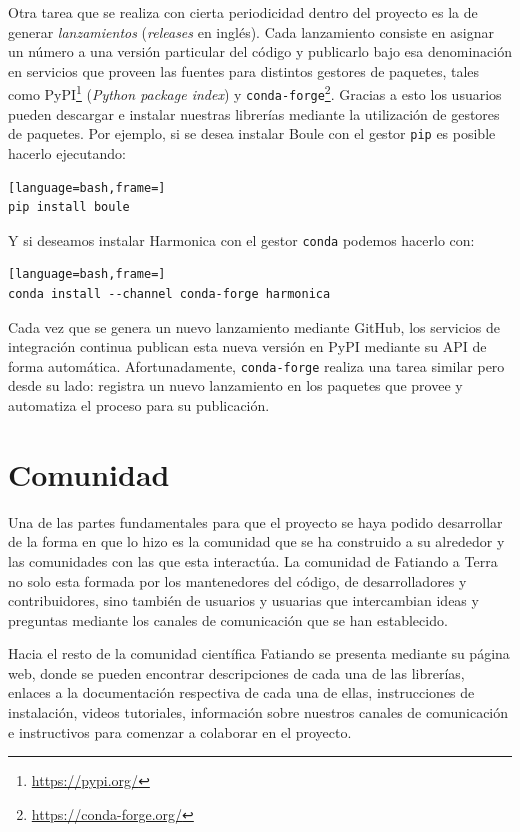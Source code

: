Otra tarea que se realiza con cierta periodicidad dentro del proyecto es la de
generar \emph{lanzamientos} (\emph{releases} en inglés).
Cada lanzamiento consiste en asignar un número a una versión particular del
código y publicarlo bajo esa denominación en servicios que proveen las fuentes
para distintos gestores de paquetes, tales como
PyPI\footnote{\url{https://pypi.org/}} (\emph{Python package index})
y \texttt{conda-forge}\footnote{\url{https://conda-forge.org/}}.
Gracias a esto los usuarios pueden descargar e instalar nuestras librerías
mediante la utilización de gestores de paquetes.
Por ejemplo, si se desea instalar Boule con el gestor \texttt{pip} es posible
hacerlo ejecutando:

\begin{lstlisting}[language=bash,frame=]
pip install boule
\end{lstlisting}

\noindent Y si deseamos instalar Harmonica con el gestor \texttt{conda} podemos
hacerlo con:

\begin{lstlisting}[language=bash,frame=]
conda install --channel conda-forge harmonica
\end{lstlisting}

Cada vez que se genera un nuevo lanzamiento mediante GitHub,
los servicios de integración continua publican esta nueva versión en PyPI
mediante su \ac{API} de forma automática.
Afortunadamente, \texttt{conda-forge} realiza una tarea similar pero desde su
lado: registra un nuevo lanzamiento en los paquetes que provee y automatiza el
proceso para su publicación.


\section{Comunidad}

Una de las partes fundamentales para que el proyecto se haya podido desarrollar
de la forma en que lo hizo es la comunidad que se ha construido a su alrededor
y las comunidades con las que esta interactúa.
La comunidad de Fatiando a Terra no solo esta formada por los mantenedores del
código, de desarrolladores y contribuidores, sino también de usuarios
y usuarias que intercambian ideas y preguntas mediante los canales de
comunicación que se han establecido.

Hacia el resto de la comunidad científica Fatiando se presenta mediante su
página web, donde se pueden encontrar descripciones de cada una de las
librerías, enlaces a la documentación respectiva de cada una de ellas,
instrucciones de instalación, videos tutoriales, información sobre nuestros
canales de comunicación e instructivos para comenzar a colaborar en el
proyecto.

